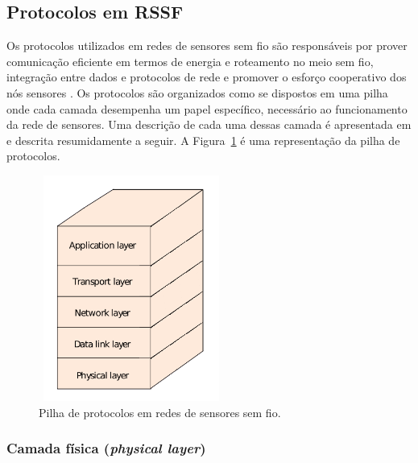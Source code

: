 \subsection{Protocolos em RSSF} 

Os protocolos utilizados em redes de sensores sem fio são responsáveis por prover comunicação eficiente em termos de energia e roteamento no meio sem fio, integração entre dados e protocolos de rede e promover o esforço cooperativo dos nós sensores \cite{Akyildiz2002}. Os protocolos são organizados como se dispostos em uma pilha onde cada camada desempenha um papel específico, necessário ao funcionamento da rede de sensores. Uma descrição de cada uma dessas camada é apresentada em  \citeyear{Akyildiz2002} e descrita resumidamente a seguir. A Figura~\ref{fig:protocolStack} é uma representação da pilha de protocolos.

\begin{figure}[!htb]
\centering
\includegraphics[width=230px,height=280px]{./Pictures/ProtocolStack.png}
\caption{Pilha de protocolos em redes de sensores sem fio.} %
\label{fig:protocolStack} %
\end{figure}


 \subsubsection{Camada física (\textit{physical layer})} 

